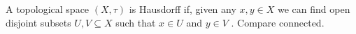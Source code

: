A topological space  $ (X, \tau ) $  is Hausdorff if, given any
 $ x,y \in X $  we can find open disjoint subsets  $ U,V \subseteq  X $  such that
 $ x \in U $  and  $ y \in V $ . Compare connected.


